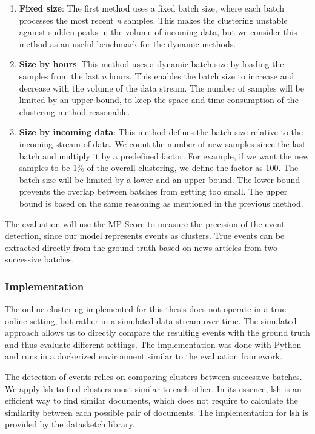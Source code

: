 \begin{enumerate}
    \item \textbf{Fixed size}: The first method uses a fixed batch size,
          where each batch processes the most recent \textit{n} samples.
          This makes the clustering unstable against sudden peaks in the volume of incoming data,
          but we consider this method as an useful benchmark for the dynamic methods.
    \item \textbf{Size by hours}: This method uses a dynamic batch size
          by loading the samples from the last \textit{n} hours.
          This enables the batch size to increase and decrease with the volume of the data stream.
          The number of samples will be limited by an upper bound,
          to keep the space and time consumption of the clustering method reasonable.
    \item \textbf{Size by incoming data}: This method defines the batch size relative to the incoming stream of data.
          We count the number of new samples since the last batch and multiply it by a predefined factor.
          For example, if we want the new samples to be 1\%
          of the overall clustering, we define the factor as 100.
          The batch size will be limited by a lower and an upper bound.
          The lower bound prevents the overlap between batches from getting too small.
          The upper bound is based on the same reasoning as mentioned in the previous method.
\end{enumerate}

The evaluation will use the MP-Score to measure the precision of the event detection,
since our model represents events as clusters.
True events can be extracted directly from the ground truth based on news articles from two successive batches.

\subsubsection{Implementation}
\label{subsubsec:4c_implementation}

The online clustering implemented for this thesis does not operate in a true online setting,
but rather in a simulated data stream over time.
The simulated approach allows us to directly compare the resulting events
with the ground truth and thus evaluate different settings.
The implementation was done with Python and runs in a dockerized environment similar to the evaluation framework.

The detection of events relies on comparing clusters between successive batches. 
We apply \gls{lsh}\cite{alex2015practical} to find clusters most similar to each other.
In its essence, \gls{lsh} is an efficient way to find similar documents,
which does not require to calculate the similarity between each possible pair of documents. 
The implementation for \gls{lsh} is provided by the datasketch library\cite{eric_zhu_2017_290602}.

